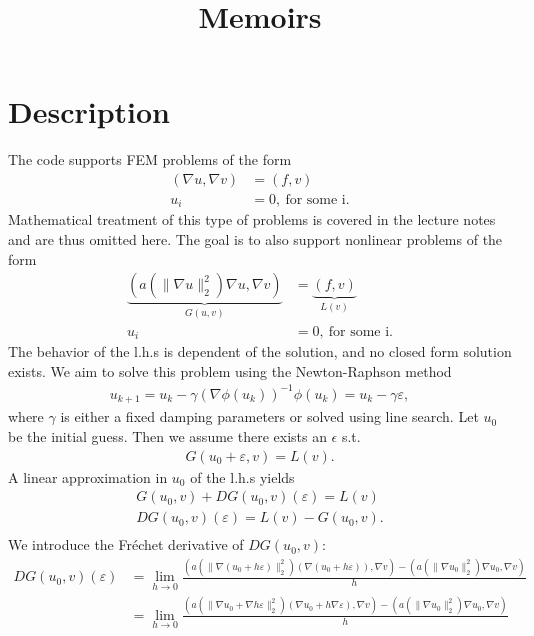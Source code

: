 \documentclass[a4paper]{article}
\newcommand{\subtitle}[1]{%
  \posttitle{%
    \par\end{center}
    \begin{center}\large#1\end{center}
    \vskip2em}
}
\begin{document}
\title{Memoirs}
\subtitle{Finite element project}
\maketitle

\section*{Description}

The code supports FEM problems of the form
\begin{align*}
(\nabla u,\nabla v) &= (f,v) \\
u_i &= 0,\ \text{for some i}.
\end{align*}
Mathematical treatment of this type of problems is covered in the lecture notes and are thus omitted here.
The goal is to also support nonlinear problems of the form
\begin{align*}
\underbrace{(a(\|\nabla u\|_2^2)\nabla u,\nabla v)}_{G(u,v)} &= \underbrace{(f,v)}_{L(v)} \\
u_i &= 0,\ \text{for some i}.
\end{align*}
The behavior of the l.h.s is dependent of the solution, and no closed form solution exists. We aim to solve this problem using the Newton-Raphson method
\begin{align*}
u_{k+1}=u_k-\gamma (\nabla\phi(u_k))^{-1}\phi(u_k)=u_k-\gamma \varepsilon,
\end{align*}
where $\gamma$ is either a fixed damping parameters or solved using line search. Let $u_0$ be the initial guess. Then we assume there exists an $\epsilon$ s.t.
\begin{align*}
G(u_0+\varepsilon,v) = L(v).
\end{align*}
A linear approximation in $u_0$ of the l.h.s yields
\begin{align*}
G(u_0,v) +DG(u_0,v)(\varepsilon) = L(v) \\
DG(u_0,v)(\varepsilon) = L(v)-G(u_0,v). \\
\end{align*}
We introduce the Fréchet derivative of $DG(u_0,v)$:
\begin{align*}
DG(u_0,v)(\varepsilon) &= \lim_{h\rightarrow 0} \frac{ \left(a\left(\|\nabla (u_0+h\varepsilon)\|_2^2\right)\left(\nabla(u_0+h\varepsilon)\right),\nabla v\right) - \left(a\left(\|\nabla u_0\|_2^2\right) \nabla u_0 ,\nabla v\right)}{h} \\
&= \lim_{h\rightarrow 0} \frac{ \left(a\left(\|\nabla u_0+\nabla h\varepsilon\|_2^2\right)\left(\nabla u_0+h\nabla\varepsilon\right),\nabla v\right) - \left(a\left(\|\nabla u_0\|_2^2\right) \nabla u_0 ,\nabla v\right)}{h}
\end{align*}
\end{document}
